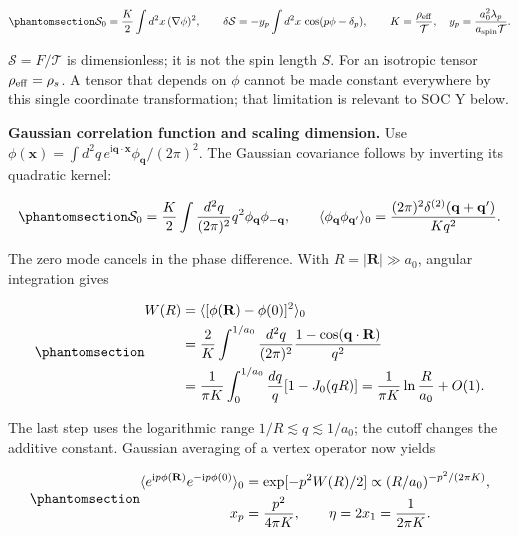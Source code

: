 \begin{equation}\phantomsection\label{eq-nbcp-clock-dimensionless-action}{
\mathcal S_0=\frac K2\int d^2x\,(\nabla\phi)^2,
\qquad
\delta\mathcal S=-y_p\int d^2x\,\cos(p\phi-\delta_p),
\qquad
K=\frac{\rho_{\rm eff}}{\mathcal T},\quad
y_p=\frac{a_0^2\lambda_p}{a_{\rm spin}\mathcal T}.
}\end{equation}

\(\mathcal S=F/\mathcal T\) is dimensionless; it is not the spin length
\(S\). For an isotropic tensor \(\rho_{\rm eff}=\rho_s\). A tensor that
depends on \(\phi\) cannot be made constant everywhere by this single
coordinate transformation; that limitation is relevant to SOC Y below.

\textbf{Gaussian correlation function and scaling dimension.} Use
\(\phi(\mathbf x)=\int d^2q\,e^{\mathrm i\mathbf q\cdot\mathbf x}\phi_{\mathbf q}/(2\pi)^2\).
The Gaussian covariance follows by inverting its quadratic kernel:

\begin{equation}\phantomsection\label{eq-nbcp-clock-propagator}{
\mathcal S_0=\frac K2\int\frac{d^2q}{(2\pi)^2}
q^2\phi_{\mathbf q}\phi_{-\mathbf q},\qquad
\langle\phi_{\mathbf q}\phi_{\mathbf q'}\rangle_0
=\frac{(2\pi)^2\delta^{(2)}(\mathbf q+\mathbf q')}{Kq^2}.
}\end{equation}

The zero mode cancels in the phase difference. With
\(R=|\mathbf R|\gg a_0\), angular integration gives

\begin{equation}\phantomsection\label{eq-nbcp-clock-phase-variance}{
\begin{aligned}
W(R)&=\langle[\phi(\mathbf R)-\phi(0)]^2\rangle_0\\
&=\frac{2}{K}\int^{1/a_0}\frac{d^2q}{(2\pi)^2}
\frac{1-\cos(\mathbf q\cdot\mathbf R)}{q^2}\\
&=\frac{1}{\pi K}\int_0^{1/a_0}\frac{dq}{q}[1-J_0(qR)]
=\frac{1}{\pi K}\ln\frac R{a_0}+O(1).
\end{aligned}
}\end{equation}

The last step uses the logarithmic range \(1/R\lesssim q\lesssim1/a_0\);
the cutoff changes the additive constant. Gaussian averaging of a vertex
operator now yields

\begin{equation}\phantomsection\label{eq-nbcp-clock-vertex-dimension}{
\begin{aligned}
\langle e^{\mathrm ip\phi(\mathbf R)}e^{-\mathrm ip\phi(0)}\rangle_0
&=\exp[-p^2W(R)/2]\propto(R/a_0)^{-p^2/(2\pi K)},\\
x_p&=\frac{p^2}{4\pi K},\qquad
\eta=2x_1=\frac{1}{2\pi K}.
\end{aligned}
}\end{equation}


